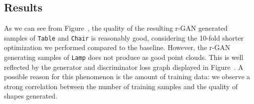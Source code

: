 \documentclass[12pt]{article}
\begin{document}
    \subsection{Results}

    As we can see from Figure~, the quality of the resulting r-GAN generated samples of \verb|Table| and \verb|Chair| is reasonably good, considering the 10-fold shorter optimization we performed compared to the baseline. However, the r-GAN generating samples of \verb|Lamp| does not produce as good point clouds. This is well reflected by the generator and discriminator loss graph displayed in Figure~. A possible reason for this phenomenon is the amount of training data: we observe a strong correlation between the number of training samples and the quality of shapes generated.
\end{document}
